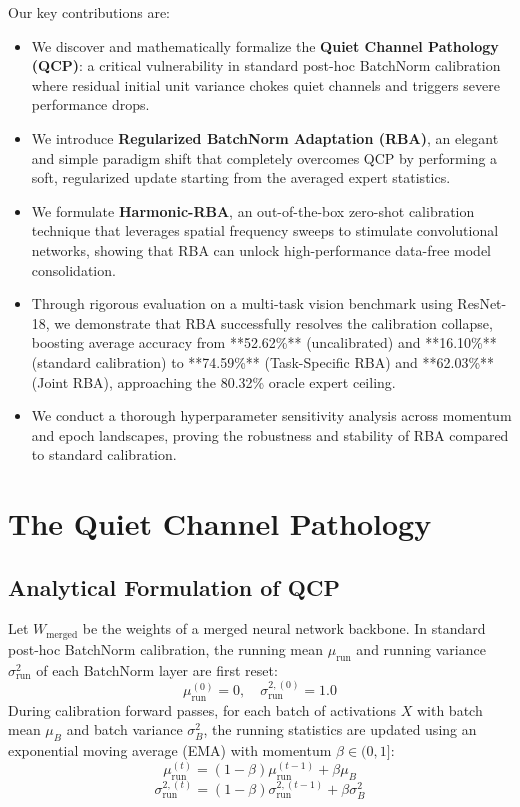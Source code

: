 \documentclass{article}
\begin{document}
Our key contributions are:
\begin{itemize}
  \item We discover and mathematically formalize the \textbf{Quiet Channel Pathology (QCP)}: a critical vulnerability in standard post-hoc BatchNorm calibration where residual initial unit variance chokes quiet channels and triggers severe performance drops.
  \item We introduce \textbf{Regularized BatchNorm Adaptation (RBA)}, an elegant and simple paradigm shift that completely overcomes QCP by performing a soft, regularized update starting from the averaged expert statistics.
  \item We formulate \textbf{Harmonic-RBA}, an out-of-the-box zero-shot calibration technique that leverages spatial frequency sweeps to stimulate convolutional networks, showing that RBA can unlock high-performance data-free model consolidation.
  \item Through rigorous evaluation on a multi-task vision benchmark using ResNet-18, we demonstrate that RBA successfully resolves the calibration collapse, boosting average accuracy from **52.62\%** (uncalibrated) and **16.10\%** (standard calibration) to **74.59\%** (Task-Specific RBA) and **62.03\%** (Joint RBA), approaching the 80.32\% oracle expert ceiling.
  \item We conduct a thorough hyperparameter sensitivity analysis across momentum and epoch landscapes, proving the robustness and stability of RBA compared to standard calibration.
\end{itemize}

\section{The Quiet Channel Pathology}
\label{sec:pathology}

\subsection{Analytical Formulation of QCP}
Let $W_{\text{merged}}$ be the weights of a merged neural network backbone. In standard post-hoc BatchNorm calibration, the running mean $\mu_{\text{run}}$ and running variance $\sigma^2_{\text{run}}$ of each BatchNorm layer are first reset:
\begin{equation}
  \mu_{\text{run}}^{(0)} = 0, \quad \sigma^{2,(0)}_{\text{run}} = 1.0
\end{equation}
During calibration forward passes, for each batch of activations $X$ with batch mean $\mu_B$ and batch variance $\sigma^2_B$, the running statistics are updated using an exponential moving average (EMA) with momentum $\beta \in (0, 1]$:
\begin{equation}
  \mu_{\text{run}}^{(t)} = (1 - \beta) \mu_{\text{run}}^{(t-1)} + \beta \mu_B
\end{equation}
\begin{equation}
  \sigma^{2,(t)}_{\text{run}} = (1 - \beta) \sigma^{2,(t-1)}_{\text{run}} + \beta \sigma^2_B
\end{equation}
\end{document}

